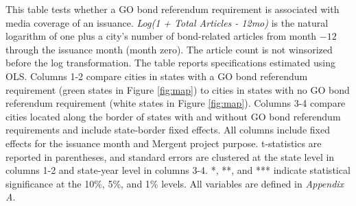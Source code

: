 \clearpage
\begin{table}[H]\centering
\def\sym#1{\ifmmode^{#1}\else\(^{#1}\)\fi}
\begingroup
\caption{\textbf{GO bond referendums and bond-related media coverage: Log-transformed OLS specification}}
\label{tab:media_coverage_ols_log}

\parbox{\textwidth}{This table tests whether a GO bond referendum requirement is associated with media coverage of an issuance. \textit{Log(1 + Total Articles - 12mo)} is the natural logarithm of one plus a city's number of bond-related articles from month $-12$ through the issuance month (month zero). The article count is not winsorized before the log transformation. The table reports specifications estimated using OLS. Columns 1-2 compare cities in states with a GO bond referendum requirement (green states in Figure \ref{fig:map}) to cities in states with no GO bond referendum requirement (white states in Figure \ref{fig:map}). Columns 3-4 compare cities located along the border of states with and without GO bond referendum requirements and include state-border fixed effects. All columns include fixed effects for the issuance month and Mergent project purpose. t-statistics are reported in parentheses, and standard errors are clustered at the state level in columns 1-2 and state-year level in columns 3-4. *, **, and *** indicate statistical significance at the 10\%, 5\%, and 1\% levels. All variables are defined in \textit{Appendix A}.}
\endgroup
\end{table}


